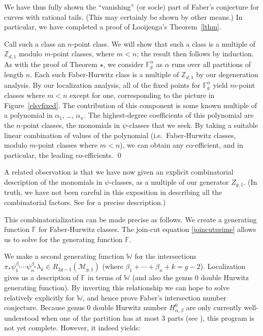 \documentclass[12pt,letterpaper]{amsart}
\newcommand{\bpf}{\noindent {\em Proof.  }}
\newcommand{\epf}{\qed \vspace{+10pt}}
\newcommand{\Z}{\mathbb{Z}}
\newcommand{\F}{\mathbb{F}}
\newcommand{\W}{\mathbb{W}}
\newcommand{\cm}{{\mathcal{M}}}
\newcommand{\al}{\alpha}
\newcommand{\be}{\beta}
\newcommand{\la}{\lambda}
\begin{document}
{We have thus fully shown the ``vanishing'' (or socle) part of
Faber's conjecture for curves with rational tails. (This
may certainly be shown by other means.)  In particular,
we have completed a proof of Looijenga's Theorem~\ref{lthm}.

\bpf Call such a class an $n$-point class.  We will show that such a
class is a multiple of $\Z_{d,1}$ modulo $m$-point classes, where
$m<n$; the result then follows by induction.  As with the proof of
Theorem $\star$, we consider $\F^{\al}_g$ as $\al$ runs over all
partitions of length $n$.  Each such Faber-Hurwitz class is a multiple
of $\Z_{d,1}$ by our degeneration analysis.  By our localization
analysis, all of the fixed points for $\F^{\al}_g$ yield $m$-point
classes where $m<n$ except for one, corresponding to the picture in
Figure~\ref{elsvfixed}.  The contribution of this component is some
known multiple of a polynomial in $\al_1$, \dots, $\al_n$.  The
highest-degree coefficients of this polynomial are the $n$-point
classes, the monomials in $\psi$-classes that we seek.  By taking a
suitable linear combination of values of the polynomial (i.e.\
Faber-Hurwitz classes, modulo $m$-point classes where $m<n$), we can
obtain any co-efficient, and in particular, the leading co-efficients.
\epf

A related observation is that we have now given an explicit
combinatorial description of the monomials in $\psi$-classes, as a
multiple of our generator $Z_{g,1}$.  (In truth, we have not been
careful in this exposition in describing all the combinatorial
factors.  See \cite{gjv} for a precise description.)

This combinatorialization can be made precise as follows.
We create a generating function $\F$ for Faber-Hurwitz classes.
The join-cut equation \eqref{joincutprime} allows us to
solve for the generating function $\F$.

We make a second generating function $\W$ for the intersections $\pi_*
\psi_1^{\be_1} \cdots \psi_n^{\be_n} \la_k \in R_{2g-1}(\cm_{g,1})$
(where $\be_1 + \cdots + \be_n + k = g-2$).  Localization gives us a
description of $\F$ in terms of $\W$ (and also the genus $0$ double
Hurwitz generating function).  By inverting this relationship we can
hope to solve relatively explicitly for $\W$, and hence prove Faber's
intersection number conjecture.  Because genus $0$ double Hurwitz
number $H^0_{\al, \be}$  are only currently well-understood
when one of the partition has at most $3$ parts (see \cite{double}),
this program is not yet complete.  However, it indeed yields:

}
\end{document}
